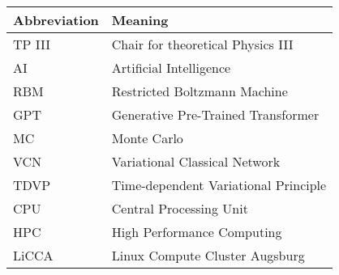 \noindent\\\\

\begin{tabular}[h]{p{3cm}|l}
	Abbreviation & Meaning\\
	\hline
	TP III & Chair for theoretical Physics III\\
	AI & Artificial Intelligence\\
	RBM & Restricted Boltzmann Machine\\ 
	GPT & Generative Pre-Trained Transformer\\
	MC & Monte Carlo\\
	VCN & Variational Classical Network\\ 
	TDVP & Time-dependent Variational Principle\\ 
	CPU & Central Processing Unit \\
	HPC & High Performance Computing\\ 
	LiCCA & Linux Compute Cluster Augsburg\\ 
\end{tabular}\\\\

\newpage